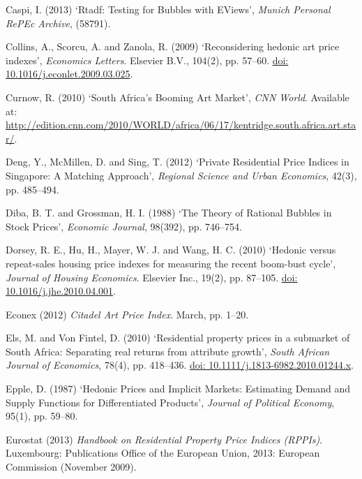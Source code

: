 \documentclass[12pt,]{article}
\begin{document}
Caspi, I. (2013) `Rtadf: Testing for Bubbles with EViews', \emph{Munich
Personal RePEc Archive}, (58791).

Collins, A., Scorcu, A. and Zanola, R. (2009) `Reconsidering hedonic art
price indexes', \emph{Economics Letters}. Elsevier B.V., 104(2), pp.
57--60.
\href{http://doi.org/10.1016/j.econlet.2009.03.025}{doi: 10.1016/j.econlet.2009.03.025}.

Curnow, R. (2010) `South Africa's Booming Art Market', \emph{CNN World}.
Available at:
\url{http://edition.cnn.com/2010/WORLD/africa/06/17/kentridge.south.africa.art.star/}.

Deng, Y., McMillen, D. and Sing, T. (2012) `Private Residential Price
Indices in Singapore: A Matching Approach', \emph{Regional Science and
Urban Economics}, 42(3), pp. 485--494.

Diba, B. T. and Grossman, H. I. (1988) `The Theory of Rational Bubbles
in Stock Prices', \emph{Economic Journal}, 98(392), pp. 746--754.

Dorsey, R. E., Hu, H., Mayer, W. J. and Wang, H. C. (2010) `Hedonic
versus repeat-sales housing price indexes for measuring the recent
boom-bust cycle', \emph{Journal of Housing Economics}. Elsevier Inc.,
19(2), pp. 87--105.
\href{http://doi.org/10.1016/j.jhe.2010.04.001}{doi: 10.1016/j.jhe.2010.04.001}.

Econex (2012) \emph{Citadel Art Price Index}. March, pp. 1--20.

Els, M. and Von Fintel, D. (2010) `Residential property prices in a
submarket of South Africa: Separating real returns from attribute
growth', \emph{South African Journal of Economics}, 78(4), pp. 418--436.
\href{http://doi.org/10.1111/j.1813-6982.2010.01244.x}{doi: 10.1111/j.1813-6982.2010.01244.x}.

Epple, D. (1987) `Hedonic Prices and Implicit Markets: Estimating Demand
and Supply Functions for Differentiated Products', \emph{Journal of
Political Economy}, 95(1), pp. 59--80.

Eurostat (2013) \emph{Handbook on Residential Property Price Indices
(RPPIs)}. Luxembourg: Publications Office of the European Union, 2013:
European Commission (November 2009).
\end{document}
